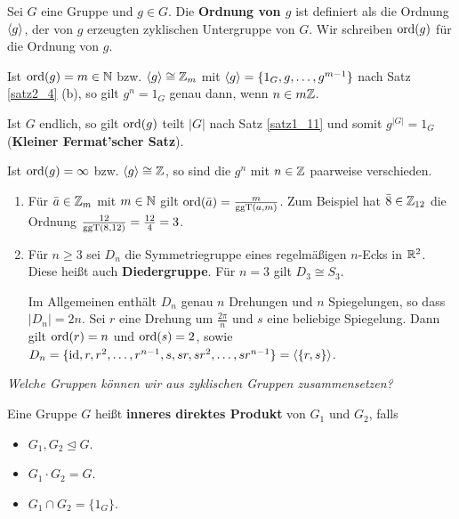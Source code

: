 \begin{definition}
	Sei $G$ eine Gruppe und $g \in G$. Die \textbf{Ordnung von $g$} ist definiert als die Ordnung $\langle g \rangle$, der von $g$ erzeugten zyklischen Untergruppe von $G$.
	Wir schreiben $\mathrm{ord}(g)$ für die Ordnung von $g$. 
\end{definition}
\begin{rem}
	Ist $\mathrm{ord}(g) = m \in \mathbb{N}$ bzw. $\langle g \rangle \cong \mathbb{Z}_m$ mit $\langle g \rangle = \{1_G, g, \dots, g^{m-1}\}$ nach Satz \ref{satz2_4} (b), so gilt $g^n = 1_G$ genau dann, wenn $n \in m\mathbb{Z}$. 
	
	Ist $G$ endlich, so gilt $\mathrm{ord}(g)$ teilt $|G|$ nach Satz \ref{satz1_11} und somit $g^{|G|} = 1_G$ (\textbf{Kleiner Fermat'scher Satz}).
	
	Ist $\mathrm{ord}(g) = \infty$ bzw. $\langle g \rangle \cong \mathbb{Z}$, so sind die $g^n$ mit $n \in \mathbb{Z}$ paarweise verschieden.
\end{rem}
\begin{beispiel}
	\begin{enumerate}[label=(\arabic*)]
		\item Für $\bar{a} \in \mathbb{Z}_m$ mit $m \in \mathbb{N}$ gilt $\mathrm{ord}(\bar{a}) = \frac{m}{\mathrm{ggT}(a,m)}$. Zum Beispiel hat $\bar{8} \in \mathbb{Z}_{12}$ die Ordnung $\frac{12}{\mathrm{ggT}(8,12)} = \frac{12}{4} = 3$.
		
		\item Für $n \geq 3$ sei $D_n$ die Symmetriegruppe eines regelmäßigen $n$-Ecks in $\mathbb{R}^2$. Diese heißt auch \textbf{Diedergruppe}. Für $n = 3$ gilt $D_3 \cong S_3$.
		
		Im Allgemeinen enthält $D_n$ genau $n$ Drehungen und $n$ Spiegelungen, so dass $|D_n| = 2n$. Sei $r$ eine Drehung um $\frac{2\pi}{n}$ und $s$ eine beliebige Spiegelung. Dann gilt $\mathrm{ord}(r) = n$ und $\mathrm{ord}(s) = 2$, sowie $D_n = \{\mathrm{id}, r, r^2, \dots, r^{n-1}, s, sr, sr^2, \dots, sr^{n-1}\} = \langle \{r,s\} \rangle$.
	\end{enumerate}
\end{beispiel}

\begin{center}
	\textit{Welche Gruppen können wir aus zyklischen Gruppen zusammensetzen?}
\end{center}

\begin{definition}
	Eine Gruppe $G$ heißt \textbf{inneres direktes Produkt} von $G_1$ und $G_2$, falls
	\begin{itemize}
		\item $G_1, G_2 \unlhd G$.
		\item $G_1 \cdot G_2 = G$.
		\item $G_1 \cap G_2 = \{1_G\}$.
	\end{itemize}
\end{definition}


